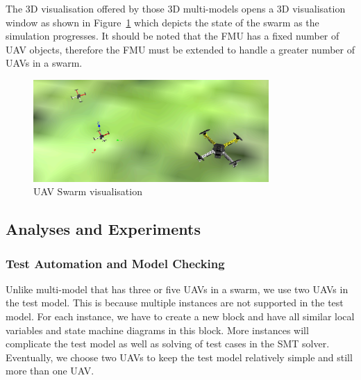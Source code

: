 The 3D visualisation offered by those 3D multi-models opens a 3D visualisation window as shown in Figure~\ref{fig:swarm-uav-vis} which depicts the state of the swarm as the simulation progresses. It should be noted that the FMU has a fixed number of UAV objects, therefore the FMU must be extended to handle a greater number of UAVs in a swarm.

\begin{figure}[htbp]
\begin{center}
\includegraphics[width=0.8\textwidth]{uavswarm/uav-3d1}
\caption{UAV Swarm visualisation}
\label{fig:swarm-uav-vis}
\end{center}
\end{figure}

\subsection{Analyses and Experiments}
\label{sec:uavswarm_into_analysis}


\subsubsection{Test Automation and Model Checking}
\label{sec:uavswarm_ta}

\graphicspath{ {./uavswarm/TA/} }
Unlike multi-model that has three or five UAVs in a swarm, we use two UAVs in the test model. This is because multiple instances are not supported in the test model. For each instance, we have to create a new block and have all similar local variables and state machine diagrams in this block. More instances will complicate the test model as well as solving of test cases in the SMT solver. Eventually, we choose two UAVs to keep the test model relatively simple and still more than one UAV.

